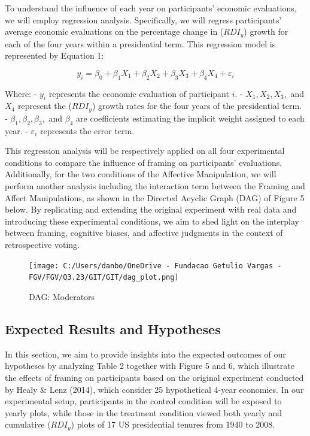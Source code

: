 \documentclass[
]{article}
\begin{document}
To understand the influence of each year on participants' economic
evaluations, we will employ regression analysis. Specifically, we will
regress participants' average economic evaluations on the percentage
change in (\(RDI_y\)) growth for each of the four years within a
presidential term. This regression model is represented by Equation 1:

\[
y_i = \beta_0 + \beta_1 X_1 + \beta_2 X_2 + \beta_3 X_3 + \beta_4 X_4 + \varepsilon_i
\]

Where: - \(y_i\) represents the economic evaluation of participant
\(i\). - \(X_1, X_2, X_3,\) and \(X_4\) represent the (\(RDI_y\)) growth
rates for the four years of the presidential term. -
\(\beta_1, \beta_2, \beta_3,\) and \(\beta_4\) are coefficients
estimating the implicit weight assigned to each year. -
\(\varepsilon_i\) represents the error term.

This regression analysis will be respectively applied on all four
experimental conditions to compare the influence of framing on
participants' evaluations. Additionally, for the two conditions of the
Affective Manipulation, we will perform another analysis including the
interaction term between the Framing and Affect Manipulations, as shown
in the Directed Acyclic Graph (DAG) of Figure 5 below. By replicating
and extending the original experiment with real data and introducing
these experimental conditions, we aim to shed light on the interplay
between framing, cognitive biases, and affective judgments in the
context of retrospective voting.

\begin{figure}
\hypertarget{fig:label}{%
\centering
\texttt{[image: C:/Users/danbo/OneDrive - Fundacao Getulio Vargas - FGV/FGV/Q3.23/GIT/GIT/dag\_plot.png]}
\caption{DAG: Moderators}\label{fig:label}
}
\end{figure}

\hypertarget{expected-results-and-hypotheses}{%
\subsection{Expected Results and
Hypotheses}\label{expected-results-and-hypotheses}}

In this section, we aim to provide insights into the expected outcomes
of our hypotheses by analyzing Table 2 together with Figure 5 and 6,
which illustrate the effects of framing on participants based on the
original experiment conducted by Healy \& Lenz (2014), which consider 25
hypothetical 4-year economies. In our experimental setup, participants
in the control condition will be exposed to yearly plots, while those in
the treatment condition viewed both yearly and cumulative (\(RDI_y\))
plots of 17 US presidential tenures from 1940 to 2008.
\end{document}
